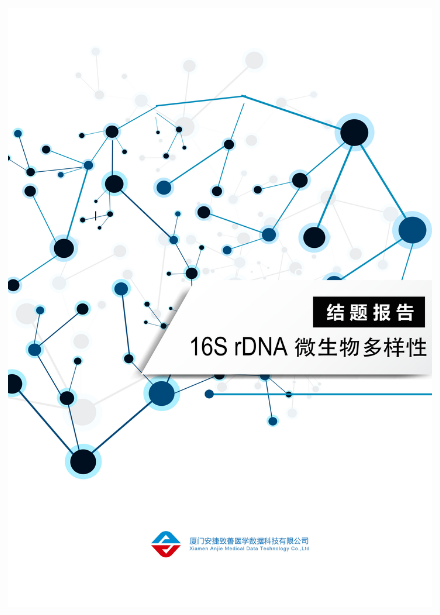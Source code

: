 \documentclass[a4paper,10pt]{article}
\numberwithin{figure}{section}
\numberwithin{table}{section}
\begin{document}
\begin{titlepage}
\begin{figure}
\label{Fig:Frontpage}
 \includegraphics[width=21cm]{./images/Frontpage.jpg}\\[0cm]  
\end{figure}
\restoregeometry
\end{titlepage}


\thispagestyle{empty}
\begin{center}
 \tableofcontents
\end{center}



\thispagestyle{empty}
\newpage
\end{document}

